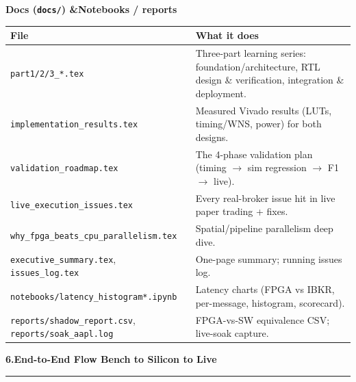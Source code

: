 \documentclass[10pt,a4paper]{article}
\newcommand{\sectionrule}{\par\nobreak\vspace{1pt}\textcolor{rulegray}{\rule{\linewidth}{0.8pt}}\par\vspace{1pt}}
\newcommand{\fpath}[1]{\texttt{\textcolor{hdrblue}{#1}}}
\begin{document}
{\bfseries\color{accentteal} Docs (\fpath{docs/}) \quad\&\quad Notebooks / reports}
\vspace{2pt}
\begin{center}\small
\renewcommand{\arraystretch}{1.2}
\begin{tabularx}{\linewidth}{@{}l X@{}}
\toprule
\textbf{File} & \textbf{What it does} \\
\midrule
\fpath{part1/2/3\_*.tex} & Three-part learning series: foundation/architecture, RTL design \& verification, integration \& deployment. \\
\fpath{implementation\_results.tex} & Measured Vivado results (LUTs, timing/WNS, power) for both designs. \\
\fpath{validation\_roadmap.tex} & The 4-phase validation plan (timing $\to$ sim regression $\to$ F1 $\to$ live). \\
\fpath{live\_execution\_issues.tex} & Every real-broker issue hit in live paper trading + fixes. \\
\fpath{why\_fpga\_beats\_cpu\_parallelism.tex} & Spatial/pipeline parallelism deep dive. \\
\fpath{executive\_summary.tex}, \fpath{issues\_log.tex} & One-page summary; running issues log. \\
\fpath{notebooks/latency\_histogram*.ipynb} & Latency charts (FPGA vs IBKR, per-message, histogram, scorecard). \\
\fpath{reports/shadow\_report.csv}, \fpath{reports/soak\_aapl.log} & FPGA-vs-SW equivalence CSV; live-soak capture. \\
\bottomrule
\end{tabularx}
\end{center}

{\large\bfseries\color{hdrblue} 6.\quad End-to-End Flow \textendash{} Bench to Silicon to Live}
\sectionrule

\begin{center}
\end{center}
\end{document}
